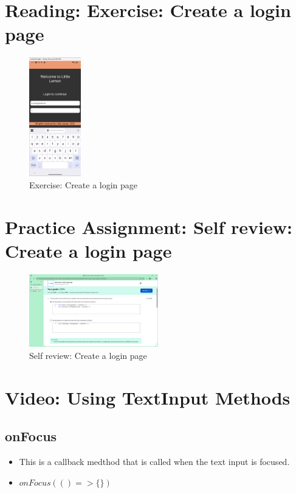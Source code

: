 \section{Reading: Exercise: Create a login page}
\begin{figure}[H]
    \centering
    \includegraphics[width=0.2\textwidth]{images/Ex5.png}
    \caption{Exercise: Create a login page}
\end{figure}

\section{Practice Assignment: Self review: Create a login page}
\begin{figure}[H]
    \centering
    \includegraphics[width=0.5\textwidth]{images/sr-4.png}
    \caption{Self review: Create a login page}
\end{figure}

\section{Video: Using TextInput Methods}
\subsection{onFocus}
\begin{itemize}
    \item This is a callback medthod that is called when the text input is focused.
    \item $onFocus(() => \{ \})$
\end{itemize}

